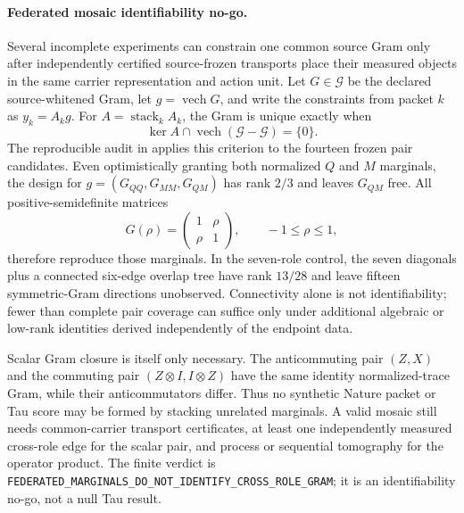\documentclass[11pt]{article}
\begin{document}
\paragraph{Federated mosaic identifiability no-go.}
Several incomplete experiments can constrain one common source Gram only
after independently certified source-frozen transports place their measured
objects in the same carrier representation and action unit.  Let
$G\in\mathcal G$ be the declared source-whitened Gram, let
$g=\operatorname{vech}G$, and write the constraints from packet $k$ as
$y_k=A_kg$.  For $A=\operatorname{stack}_kA_k$, the Gram is unique exactly
when
\begin{equation}
 \ker A\cap\operatorname{vech}(\mathcal G-\mathcal G)=\{0\}.
 \label{eq:federatedgramcriterion}
\end{equation}
The reproducible audit in
 applies this criterion to
the fourteen frozen pair candidates.  Even optimistically granting both
normalized $Q$ and $M$ marginals, the design for
$g=(G_{QQ},G_{MM},G_{QM})$ has rank $2/3$ and leaves $G_{QM}$ free.  All
positive-semidefinite matrices
\begin{equation}
 G(\rho)=\begin{pmatrix}1&\rho\\\rho&1\end{pmatrix},
 \qquad -1\leq\rho\leq1,
 \label{eq:federatedpairfamily}
\end{equation}
therefore reproduce those marginals.  In the seven-role control, the seven
diagonals plus a connected six-edge overlap tree have rank $13/28$ and leave
fifteen symmetric-Gram directions unobserved.  Connectivity alone is not
identifiability; fewer than complete pair coverage can suffice only under
additional algebraic or low-rank identities derived independently of the
endpoint data.

Scalar Gram closure is itself only necessary.  The anticommuting pair
$(Z,X)$ and the commuting pair $(Z\otimes I,I\otimes Z)$ have the same
identity normalized-trace Gram, while their anticommutators differ.  Thus no
synthetic Nature packet or Tau score may be formed by stacking unrelated
marginals.  A valid mosaic still needs common-carrier transport certificates,
at least one independently measured cross-role edge for the scalar pair, and
process or sequential tomography for the operator product.  The finite
verdict is
\texttt{FEDERATED\_MARGINALS\_DO\_NOT\_IDENTIFY\_CROSS\_ROLE\_GRAM}; it is an
identifiability no-go, not a null Tau result.
\end{document}
